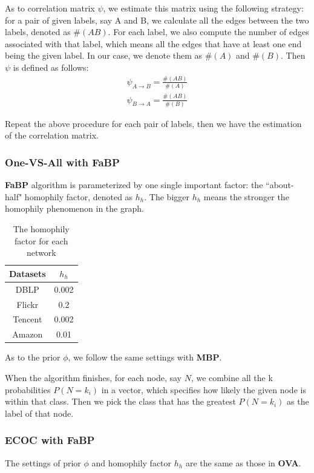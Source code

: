 As to correlation matrix $\psi$, we estimate this matrix using the following strategy: for a pair of given labels, say A and B, we calculate all the edges between the two labels, denoted as $\#(AB)$. For each label, we also compute the number of edges associated with that label, which means all the edges that have at least one end being the given label. In our case, we denote them as $\#(A)$ and $\#(B)$. Then $\psi$ is defined as follows:
\begin{gather*}
	\psi_{A\rightarrow B} = \frac{\#(AB)}{\#(A)}\\
	\psi_{B\rightarrow A} = \frac{\#(AB)}{\#(B)}
\end{gather*}

Repeat the above procedure for each pair of labels, then we have the estimation of the correlation matrix.

\subsubsection*{One-VS-All with \textbf{FaBP}}
\textbf{FaBP} algorithm is parameterized by one single important factor: the ``about-half" homophily factor, denoted as $h_h$. The bigger $h_h$ means the stronger the homophily phenomenon in the graph.

\begin{table}[!ht]
\centering
\begin{tabular}{c|c}
\toprule
\textbf{Datasets} & \textbf{$h_h$}\\
\midrule
DBLP & 0.002\\
Flickr & 0.2\\
Tencent & 0.002\\
Amazon & 0.01\\
\bottomrule
\end{tabular}
\caption{The homophily factor for each network}
\end{table} 

As to the prior $\phi$, we follow the same settings with \textbf{MBP}.

When the algorithm finishes, for each node, say $N$, we combine all the k probabilities $P(N=k_i)$ in a vector, which specifies how likely the given node is within that class. Then we pick the class that has the greatest $P(N=k_i)$ as the label of that node.

\subsubsection*{ECOC with \textbf{FaBP}}
The settings of prior $\phi$ and homophily factor $h_h$ are the same as those in \textbf{OVA}.

